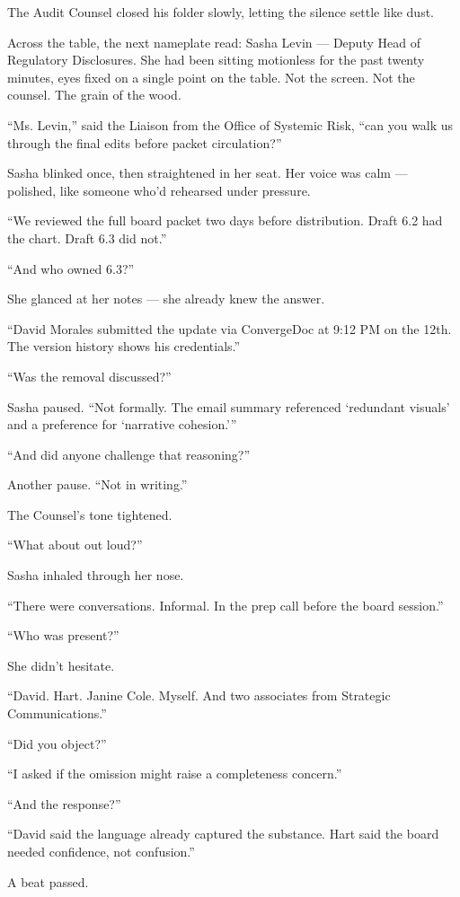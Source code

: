 The Audit Counsel closed his folder slowly, letting the silence settle like dust.

Across the table, the next nameplate read: Sasha Levin — Deputy Head of Regulatory Disclosures.
She had been sitting motionless for the past twenty minutes, eyes fixed on a single point on the table. Not the screen. 
Not the counsel. The grain of the wood.

“Ms. Levin,” said the Liaison from the Office of Systemic Risk, “can you walk us through the final edits before 
packet circulation?”

Sasha blinked once, then straightened in her seat.
Her voice was calm — polished, like someone who’d rehearsed under pressure.

“We reviewed the full board packet two days before distribution. Draft 6.2 had the chart. Draft 6.3 did not.”

“And who owned 6.3?”

She glanced at her notes — she already knew the answer.

“David Morales submitted the update via ConvergeDoc at 9:12 PM on the 12th. The version history shows his credentials.”

“Was the removal discussed?”

Sasha paused. “Not formally. The email summary referenced ‘redundant visuals’ and a preference for ‘narrative cohesion.’”

“And did anyone challenge that reasoning?”

Another pause. “Not in writing.”

The Counsel’s tone tightened.

“What about out loud?”

Sasha inhaled through her nose.

“There were conversations. Informal. In the prep call before the board session.”

“Who was present?”

She didn’t hesitate.

“David. Hart. Janine Cole. Myself. And two associates from Strategic Communications.”

“Did you object?”

“I asked if the omission might raise a completeness concern.”

“And the response?”

“David said the language already captured the substance. Hart said the board needed confidence, not confusion.”

A beat passed.

